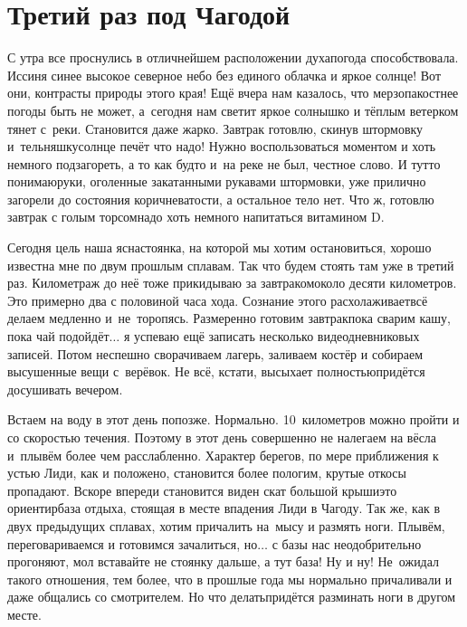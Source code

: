 \chapter{Третий раз под Чагодой} 
\vepsianrose

С утра все проснулись в отличнейшем расположении духа\mdash погода способствовала. Иссиня синее высокое северное небо без единого облачка и яркое солнце! Вот они, контрасты природы этого края! Ещё вчера нам казалось, что мерзопакостнее погоды быть не может, а~сегодня нам светит яркое солнышко и тёплым ветерком тянет с~реки. Становится даже жарко. Завтрак готовлю, скинув штормовку и~тельняшку\mdash солнце печёт что надо! Нужно воспользоваться моментом и хоть немного подзагореть, а то как будто и~на реке не был, честное слово. И тут\sdash то понимаю\mdash руки, оголенные закатанными рукавами штормовки, уже прилично загорели до состояния коричневатости, а остальное тело нет. Что ж, готовлю завтрак с голым торсом\mdash надо хоть немного напитаться витамином D.

Сегодня цель наша ясна\mdash стоянка, на которой мы хотим остановиться, хорошо известна мне по двум прошлым сплавам. Так что будем стоять там уже в третий раз. Километраж до неё тоже прикидываю за завтраком\mdash около десяти километров. Это примерно два с половиной часа хода. Сознание этого расхолаживает\mdash всё делаем медленно и~не~торопясь. Размеренно готовим завтрак\mdash пока сварим кашу, пока чай подойдёт$\ldots$ я успеваю ещё записать несколько видеодневниковых записей. Потом неспешно сворачиваем лагерь, заливаем костёр и собираем высушенные вещи с~верёвок. Не всё, кстати, высыхает полностью\mdash придётся досушивать вечером.

Встаем на воду в этот день попозже. Нормально. 10~километров можно пройти и со скоростью течения. Поэтому в этот день совершенно не налегаем на вёсла и~плывём более чем расслабленно. Характер берегов, по мере приближения к устью Лиди, как и положено, становится более пологим, крутые откосы пропадают. Вскоре впереди становится виден скат большой крыши\mdash это ориентир\mdash база отдыха, стоящая в месте впадения Лиди в Чагоду. Так же, как в двух предыдущих сплавах, хотим причалить на~мысу и размять ноги. Плывём, переговариваемся и готовимся зачалиться, но$\ldots$ с базы нас неодобрительно прогоняют, мол вставайте не стоянку дальше, а тут база! Ну и ну! Не~ожидал такого отношения, тем более, что в прошлые года мы нормально причаливали и даже общались со смотрителем. Но что делать\mdash придётся разминать ноги в другом месте. 

